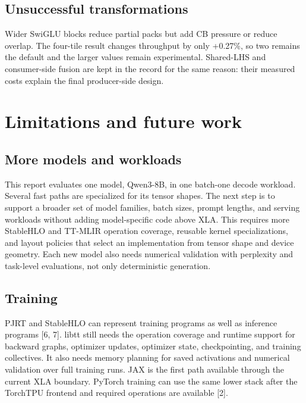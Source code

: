 \documentclass[
  10pt,
  american,
  10pt,
  letterpaper]{article}
\begin{document}
\hypertarget{unsuccessful-transformations}{%
\subsection{Unsuccessful
transformations}\label{unsuccessful-transformations}}

Wider SwiGLU blocks reduce partial packs but add CB pressure or reduce
overlap. The four-tile result changes throughput by only +0.27\%, so two
remains the default and the larger values remain experimental.
Shared-LHS and consumer-side fusion are kept in the record for the same
reason: their measured costs explain the final producer-side design.

\hypertarget{limitations-and-future-work}{%
\section{Limitations and future
work}\label{limitations-and-future-work}}

\hypertarget{more-models-and-workloads}{%
\subsection{More models and workloads}\label{more-models-and-workloads}}

This report evaluates one model, Qwen3-8B, in one batch-one decode
workload. Several fast paths are specialized for its tensor shapes. The
next step is to support a broader set of model families, batch sizes,
prompt lengths, and serving workloads without adding model-specific code
above XLA. This requires more StableHLO and TT-MLIR operation coverage,
reusable kernel specializations, and layout policies that select an
implementation from tensor shape and device geometry. Each new model
also needs numerical validation with perplexity and task-level
evaluations, not only deterministic generation.

\hypertarget{training}{%
\subsection{Training}\label{training}}

PJRT and StableHLO can represent training programs as well as inference
programs {[}6, 7{]}. libtt still needs the operation coverage and
runtime support for backward graphs, optimizer updates, optimizer state,
checkpointing, and training collectives. It also needs memory planning
for saved activations and numerical validation over full training runs.
JAX is the first path available through the current XLA boundary.
PyTorch training can use the same lower stack after the TorchTPU
frontend and required operations are available {[}2{]}.
\end{document}
